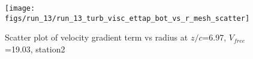 \begin{figure}[H]
\centering
\texttt{[image: figs/run\_13/run\_13\_turb\_visc\_ettap\_bot\_vs\_r\_mesh\_scatter]}
\caption{Scatter plot of velocity gradient term vs radius at $z/c$=6.97, $V_{free}$=19.03, station2}
\label{fig:run_13_turb_visc_ettap_bot_vs_r_mesh_scatter}
\end{figure}


